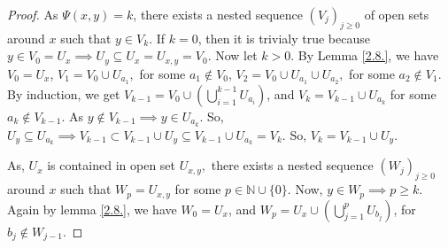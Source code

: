 \documentclass[10pt,a4paper]{amsart}
\begin{document}
\begin{proof} 
	As  $\Psi(x,y)=k$, there exists a nested sequence $(V_j)_{j\geq 0}$ of open sets around $x$ such that $y\in V_k$. If $k=0$, then it is trivialy true because $y\in V_0=U_x\implies U_y\subseteq U_x=U_{x,y}=V_0$. Now let $k>0$. By Lemma \ref{2.8.}, we have $V_0= U_x$, $V_1= V_0\cup U_{a_1},$ for some $a_1\notin V_0$, $V_2= V_0\cup U_{a_1}\cup U_{a_2},$ for some  $a_2 \notin V_1$. By induction, we get $V_{k-1}= V_0\cup (\bigcup\limits_{i=1}^{k-1} U_{a_i})$, and $V_k= V_{k-1}\cup U_{a_k}$ for some $a_k\notin V_{k-1}$. As $y\notin V_{k-1}\implies y\in U_{a_k}$. So, $U_y\subseteq U_{a_k} \implies V_{k-1}\subset V_{k-1}\cup U_y\subseteq V_{k-1}\cup  U_{a_k} =V_k.$ %
	So, $V_k= V_{k-1}\cup U_y$. \par 
	As, $U_x$ is contained in open set $U_{x,y},$ there exists a nested sequence $(W_j)_{j\geq 0}$ around $x$ such that $W_p=U_{x,y}$ for some $p\in \mathbb{N}\cup\{0\}$. Now, $y\in W_p\implies p\geq k.$ Again by lemma \ref{2.8.}, we have $W_0= U_x$, and
	$W_p= U_x\cup (\bigcup\limits_{j=1}^p U_{b_j})$, for $b_j \notin W_{j-1}$.
	
	
	
	

\end{proof}
\end{document}
